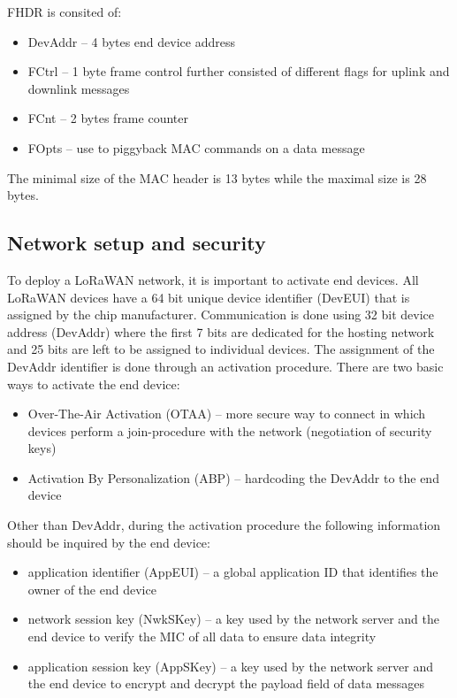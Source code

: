 FHDR is consited of:
\begin{itemize}
    \item DevAddr -- 4 bytes end device address
    \item FCtrl -- 1 byte frame control further consisted of different flags for uplink and downlink messages
    \item FCnt -- 2 bytes frame counter
    \item FOpts -- use to piggyback MAC commands on a data message
\end{itemize}

The minimal size of the MAC header is 13 bytes while the maximal size is 28 bytes.

\subsection{Network setup and security}
To deploy a LoRaWAN network, it is important to activate end devices. 
All LoRaWAN devices have a 64 bit unique device identifier (DevEUI) that is assigned by the chip manufacturer.
Communication is done using 32 bit device address (DevAddr) where the first 7 bits are dedicated for the hosting network and 25 bits are left to be assigned to individual devices. 
The assignment of the DevAddr identifier is done through an activation procedure. 
There are two basic ways to activate the end device: \cite{TTN}
\begin{itemize}
    \item Over-The-Air Activation (OTAA) -- more secure way to connect in which devices perform a join-procedure with the network (negotiation of security keys)
    \item Activation By Personalization (ABP) -- hardcoding the DevAddr to the end device
\end{itemize}

Other than DevAddr, during the activation procedure the following information should be inquired by the end device: \cite{Aloys_LoRa}
\begin{itemize}
    \item application identifier (AppEUI) -- a global application ID that identifies the owner of the end device
    \item network session key (NwkSKey) -- a key used by the network server and the end device to verify the MIC of all data to ensure data integrity
    \item application session key (AppSKey) -- a key used by the network server and the end device to encrypt and decrypt the payload field of data messages
\end{itemize}

